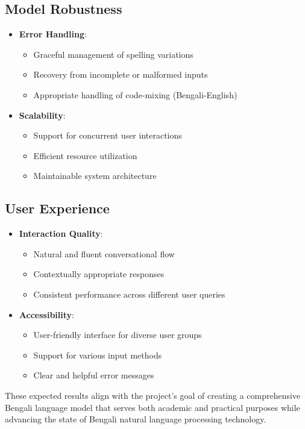 \subsection{Model Robustness}
\begin{itemize}
    \item \textbf{Error Handling}:
    \begin{itemize}
        \item Graceful management of spelling variations
        \item Recovery from incomplete or malformed inputs
        \item Appropriate handling of code-mixing (Bengali-English)
    \end{itemize}
    
    \item \textbf{Scalability}:
    \begin{itemize}
        \item Support for concurrent user interactions
        \item Efficient resource utilization
        \item Maintainable system architecture
    \end{itemize}
\end{itemize}

\subsection{User Experience}
\begin{itemize}
    \item \textbf{Interaction Quality}:
    \begin{itemize}
        \item Natural and fluent conversational flow
        \item Contextually appropriate responses
        \item Consistent performance across different user queries
    \end{itemize}
    
    \item \textbf{Accessibility}:
    \begin{itemize}
        \item User-friendly interface for diverse user groups
        \item Support for various input methods
        \item Clear and helpful error messages
    \end{itemize}
\end{itemize}

These expected results align with the project's goal of creating a comprehensive Bengali language model that serves both academic and practical purposes while advancing the state of Bengali natural language processing technology.